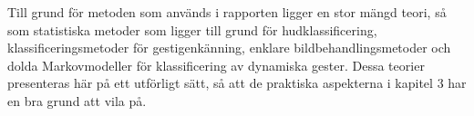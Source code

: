 \documentclass[../rapport_MVEX01-11-05]{subfiles}
\begin{document}
Till grund för metoden som används i rapporten ligger en stor mängd teori, så som
statistiska metoder som ligger till grund för hudklassificering,
klassificeringsmetoder för gestigenkänning, enklare bildbehandlingsmetoder
och dolda Markovmodeller för klassificering av dynamiska gester. Dessa teorier
presenteras här på ett utförligt sätt, så att de praktiska aspekterna i
kapitel 3 har en bra grund att vila på.
\end{document}
